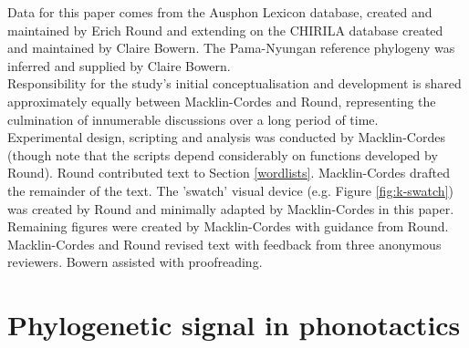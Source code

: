 \noindent
Data for this paper comes from the Ausphon Lexicon database, created and maintained by Erich Round and extending on the CHIRILA database created and maintained by Claire Bowern. The Pama-Nyungan reference phylogeny was inferred and supplied by Claire Bowern.\\

\noindent
Responsibility for the study's initial conceptualisation and development is shared approximately equally between Macklin-Cordes and Round, representing the culmination of innumerable discussions over a long period of time.\\

\noindent
Experimental design, scripting and analysis was conducted by Macklin-Cordes (though note that the scripts depend considerably on functions developed by Round). Round contributed text to Section \ref{wordlists}. Macklin-Cordes drafted the remainder of the text. The 'swatch' visual device (e.g. Figure \ref{fig:k-swatch}) was created by Round and minimally adapted by Macklin-Cordes in this paper. Remaining figures were created by Macklin-Cordes with guidance from Round. Macklin-Cordes and Round revised text with feedback from three anonymous reviewers. Bowern assisted with proofreading.

\chapter[Phylogenetic signal in phonotactics]{Phylogenetic signal in phonotactics}
\label{ch-phylo-signal}	%
\pagestyle{headings}


